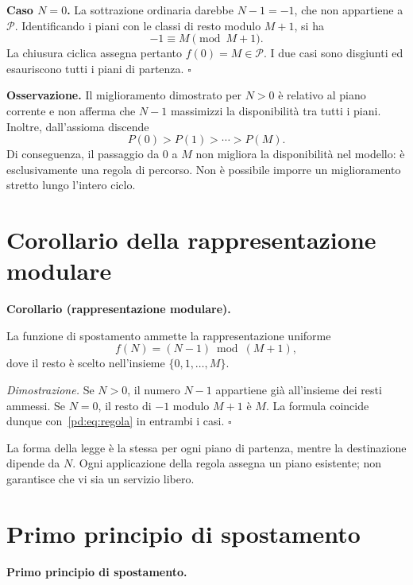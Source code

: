 \medskip
\noindent\textbf{Caso $N=0$.} La sottrazione ordinaria darebbe $N-1=-1$, che non appartiene a $\mathcal{P}$. Identificando i piani con le classi di resto modulo $M+1$, si ha
\[
-1\equiv M\pmod{M+1}.
\]
La chiusura ciclica assegna pertanto $f(0)=M\in\mathcal{P}$. I due casi sono disgiunti ed esauriscono tutti i piani di partenza.
\hfill$\square$\par\medskip

\par\medskip\noindent\textbf{Osservazione.} 
Il miglioramento dimostrato per $N>0$ è relativo al piano corrente e non afferma che $N-1$ massimizzi la disponibilità tra tutti i piani. Inoltre, dall'assioma discende
\[
P(0)>P(1)>\cdots>P(M).
\]
Di conseguenza, il passaggio da $0$ a $M$ non migliora la disponibilità nel modello: è esclusivamente una regola di percorso. Non è possibile imporre un miglioramento stretto lungo l'intero ciclo.
\par\medskip

\section{Corollario della rappresentazione modulare}
\par\medskip\noindent\textbf{Corollario (rappresentazione modulare).}\ \itshape

La funzione di spostamento ammette la rappresentazione uniforme
\begin{equation}\label{pd:eq:modulare}
\boxed{f(N)=(N-1)\bmod(M+1),}
\end{equation}
dove il resto è scelto nell'insieme $\{0,1,\ldots,M\}$.
\par\normalfont\medskip
\par\noindent\textit{Dimostrazione.} 
Se $N>0$, il numero $N-1$ appartiene già all'insieme dei resti ammessi. Se $N=0$, il resto di $-1$ modulo $M+1$ è $M$. La formula coincide dunque con~\eqref{pd:eq:regola} in entrambi i casi.
\hfill$\square$\par\medskip
La forma della legge è la stessa per ogni piano di partenza, mentre la destinazione dipende da $N$. Ogni applicazione della regola assegna un piano esistente; non garantisce che vi sia un servizio libero.

\section{Primo principio di spostamento}
\par\medskip\noindent\textbf{Primo principio di spostamento.}\ \itshape

